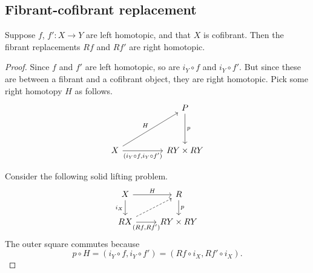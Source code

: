 \documentclass[main.tex]{subfiles}
\begin{document}
\subsection{Fibrant-cofibrant replacement}
\label{ssc:fibrant_cofibrant_replacement}

\begin{lemma}
  \label{lemma:fibrant_replacement_turns_left_homotopy_from_cofibrant_into_right_homotopy}
  Suppose $f$, $f'\colon X \to Y$ are left homotopic, and that $X$ is cofibrant. Then the fibrant replacements $Rf$ and $Rf'$ are right homotopic.
\end{lemma}
\begin{proof}
  Since $f$ and $f'$ are left homotopic, so are $i_{Y} \circ f$ and $i_{Y} \circ f'$. But since these are between a fibrant and a cofibrant object, they are right homotopic. Pick some right homotopy $H$ as follows.
  \begin{equation*}
    \begin{tikzcd}[row sep=huge, column sep=huge]
      & P
      \arrow[d, "p"]
      \\
      X
      \arrow[ur, "H"]
      \arrow[r, swap, "{(i_{Y} \circ f, i_{Y} \circ f')}"]
      & RY \times RY
    \end{tikzcd}
  \end{equation*}

  Consider the following solid lifting problem.
  \begin{equation*}
    \begin{tikzcd}
      X
      \arrow[r, "H"]
      \arrow[d, swap, "i_{X}"]
      & R
      \arrow[d, "p"]
      \\
      RX
      \arrow[r, swap, "{(Rf, Rf')}"]
      \arrow[ur, dashed]
      & RY \times RY
    \end{tikzcd}
  \end{equation*}
  The outer square commutes because
  \begin{equation*}
    p \circ H = (i_{Y} \circ f, i_{Y} \circ f') = (Rf \circ i_{X}, Rf' \circ i_{X}).
  \end{equation*}
\end{proof}
\end{document}
